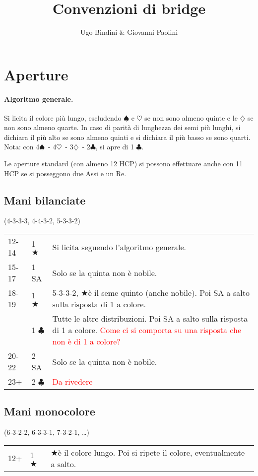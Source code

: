 \documentclass[a4paper,10pt]{article}
\title{Convenzioni di bridge}
\author{Ugo Bindini \& Giovanni Paolini}
\renewcommand{\c}{$\clubsuit$\xspace}
\renewcommand{\d}{$\diamondsuit$\xspace}
\newcommand{\h}{$\heartsuit$\xspace}
\newcommand{\s}{$\spadesuit$\xspace}
\renewcommand{\j}{$\bigstar$\xspace}
\newcommand{\sa}{SA\xspace}
\newcommand{\smallspace}{\vskip0.3cm}
\newcommand{\note}[1]{\textcolor{red}{#1}}
\newenvironment{threecol}
  {\smallspace\noindent\begin{tabular}{l l p{0.7\textwidth}}}
  {\end{tabular}\smallspace}
\begin{document}
\maketitle

\tableofcontents

\pagebreak
\section{Aperture}

\paragraph{Algoritmo generale.}
Si licita il colore pi\`u lungo, escludendo \s e \h se non sono almeno quinte e le \d se non sono almeno quarte.
In caso di parit\`a di lunghezza dei semi pi\`u lunghi, si dichiara il pi\`u alto se sono almeno quinti e si dichiara il pi\`u basso se sono quarti.
Nota: con 4\s\ - 4\h\ - 3\d\ - 2\c, si apre di 1 \c.

\noindent Le aperture standard (con almeno 12 HCP) si possono effettuare anche con 11 HCP se si posseggono due Assi e un Re.

\subsection{Mani bilanciate}
(4-3-3-3, 4-4-3-2, 5-3-3-2)
\smallspace

\begin{threecol}
 12-14 & 1 \j & Si licita seguendo l'algoritmo generale.\\
 15-17 & 1 \sa & Solo se la quinta non \`e nobile.\\
 18-19 & 1 \j & 5-3-3-2, \j \`e il seme quinto (anche nobile). Poi \sa a salto sulla risposta di 1 a colore.\\
       & 1 \c & Tutte le altre distribuzioni. Poi \sa a salto sulla risposta di 1 a colore. \note{Come ci si comporta su una risposta che non è di 1 a colore?}\\
 20-22 & 2 \sa & Solo se la quinta non è nobile.\\
 23+ & 2 \c & \note{Da rivedere}
\end{threecol}


\subsection{Mani monocolore}
(6-3-2-2, 6-3-3-1, 7-3-2-1, \dots)

\begin{threecol}
 12+ & 1 \j & \j \`e il colore lungo. Poi si ripete il colore, eventualmente a salto.
\end{threecol}
\end{document}
